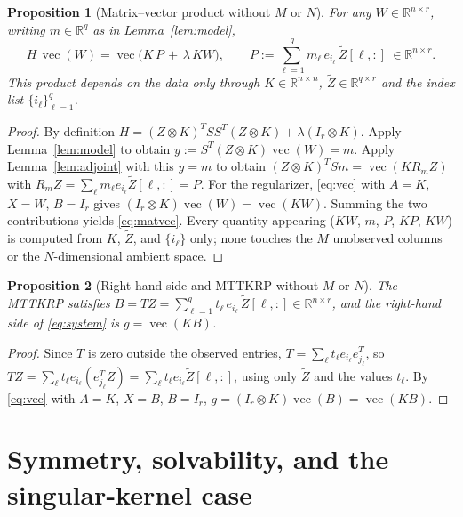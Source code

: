 \documentclass[12pt]{article}
\DeclareMathOperator{\vecop}{vec}
\newcommand{\bR}{\mathbb{R}}
\newcommand{\tZ}{\tilde Z}
\newtheorem{proposition}{Proposition}
\begin{document}
\begin{proposition}[Matrix--vector product without $M$ or $N$]\label{prop:matvec}
For any $W\in\bR^{n\times r}$, writing $m\in\bR^q$ as in Lemma~\ref{lem:model},
\begin{equation}\label{eq:matvec}
  H\,\vecop(W)=\vecop\!\Big(K\,P\,+\,\lambda\,KW\Big),
  \qquad
  P:=\sum_{\ell=1}^{q}m_\ell\,e_{i_\ell}\,\tZ[\ell,:]\ \in\bR^{n\times r}.
\end{equation}
This product depends on the data only through $K\in\bR^{n\times n}$,
$\tZ\in\bR^{q\times r}$ and the index list $\{i_\ell\}_{\ell=1}^q$.
\end{proposition}
\begin{proof}
By definition $H=(Z\otimes K)^{T}SS^{T}(Z\otimes K)+\lambda(I_r\otimes K)$. Apply
Lemma~\ref{lem:model} to obtain $y:=S^{T}(Z\otimes K)\vecop(W)=m$. Apply
Lemma~\ref{lem:adjoint} with this $y=m$ to obtain
$(Z\otimes K)^{T}Sm=\vecop(K R_m Z)$ with $R_mZ=\sum_\ell m_\ell e_{i_\ell}\tZ[\ell,:]=P$.
For the regularizer, \eqref{eq:vec} with $A=K$, $X=W$, $B=I_r$ gives
$(I_r\otimes K)\vecop(W)=\vecop(KW)$. Summing the two contributions yields
\eqref{eq:matvec}. Every quantity appearing ($KW$, $m$, $P$, $KP$, $KW$) is computed
from $K$, $\tZ$, and $\{i_\ell\}$ only; none touches the $M$ unobserved columns or
the $N$-dimensional ambient space.
\end{proof}

\begin{proposition}[Right-hand side and MTTKRP without $M$ or $N$]\label{prop:rhs}
The MTTKRP satisfies
$B=TZ=\sum_{\ell=1}^{q}t_\ell\,e_{i_\ell}\,\tZ[\ell,:]\in\bR^{n\times r}$, and the
right-hand side of \eqref{eq:system} is $g=\vecop(KB)$.
\end{proposition}
\begin{proof}
Since $T$ is zero outside the observed entries, $T=\sum_\ell t_\ell e_{i_\ell}e_{j_\ell}^{T}$,
so $TZ=\sum_\ell t_\ell e_{i_\ell}(e_{j_\ell}^{T}Z)=\sum_\ell t_\ell e_{i_\ell}\tZ[\ell,:]$,
using only $\tZ$ and the values $t_\ell$. By \eqref{eq:vec} with $A=K$, $X=B$, $B=I_r$,
$g=(I_r\otimes K)\vecop(B)=\vecop(KB)$.
\end{proof}

\section{Symmetry, solvability, and the singular-kernel case}
\end{document}
